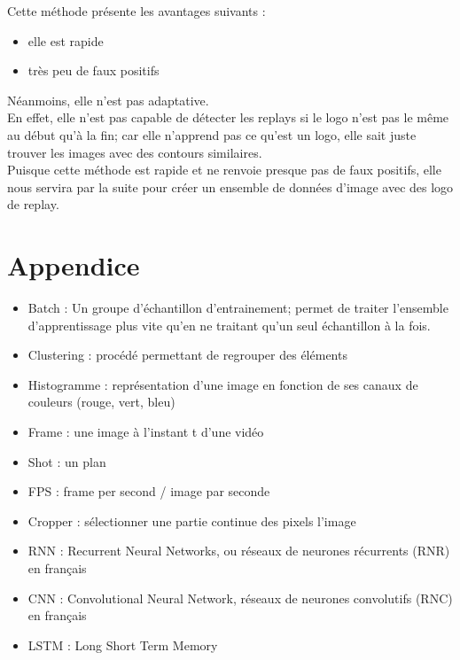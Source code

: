 \documentclass[11pt]{article}
\begin{document}
Cette méthode présente les avantages suivants :\\
\begin{itemize}
\item elle est rapide\\
\item très peu de faux positifs\\
\end{itemize}
Néanmoins, elle n'est pas adaptative.\\
En effet, elle n'est pas capable de détecter les replays si le logo n'est pas le même au début qu'à la fin; car elle n'apprend pas ce qu'est un logo, elle sait juste trouver les images avec des contours similaires.\\

Puisque cette méthode est rapide et ne renvoie presque pas de faux positifs, elle nous servira par la suite pour créer un ensemble de données d'image avec des logo de replay.\\

\newpage
\section{Appendice}
\label{sec:org49fa052}
\begin{itemize}
\item Batch : Un groupe d'échantillon d'entrainement; permet de traiter l'ensemble d'apprentissage plus vite qu'en ne traitant qu'un seul échantillon à la fois.\\
\item Clustering : procédé permettant de regrouper des éléments\\
\item Histogramme : représentation d'une image en fonction de ses canaux de couleurs (rouge, vert, bleu)\\
\item Frame : une image à l'instant t d'une vidéo\\
\item Shot : un plan\\
\item FPS : frame per second / image par seconde\\
\item Cropper : sélectionner une partie continue des pixels l'image\\
\item RNN : Recurrent Neural Networks, ou réseaux de neurones récurrents (RNR) en français\\
\item CNN : Convolutional Neural Network, réseaux de neurones convolutifs (RNC) en français\\
\item LSTM : Long Short Term Memory\\
\end{itemize}
\end{document}
